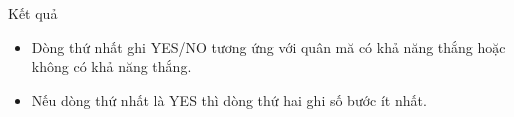 Kết quả
\begin{itemize}
	\item     Dòng thứ nhất ghi YES/NO tương ứng với quân mă có khả năng thắng hoặc không có khả năng thắng.   
	\item     Nếu dòng thứ nhất là YES thì dòng thứ hai ghi số bước ít nhất.   
\end{itemize}